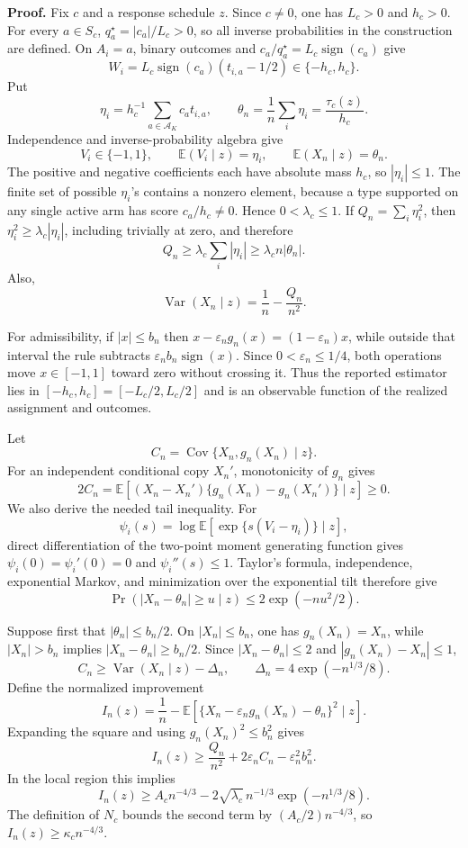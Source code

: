 \textbf{Proof.}
Fix \(c\) and a response schedule \(z\). Since \(c\neq0\), one has \(L_c>0\) and \(h_c>0\). For every \(a\in S_c\), \(q_a^\star=|c_a|/L_c>0\), so all inverse probabilities in the construction are defined. On \(A_i=a\), binary outcomes and \(c_a/q_a^\star=L_c\operatorname{sign}(c_a)\) give
\[
 W_i=L_c\operatorname{sign}(c_a)(t_{i,a}-1/2)\in\{-h_c,h_c\}.
\]
Put
\[
 \eta_i=h_c^{-1}\sum_{a\in\mathcal A_K}c_at_{i,a},
 \qquad
 \theta_n=\frac1n\sum_i\eta_i=\frac{\tau_c(z)}{h_c}.
\]
Independence and inverse-probability algebra give
\[
 V_i\in\{-1,1\},\qquad
 \mathbb E(V_i\mid z)=\eta_i,
 \qquad
 \mathbb E(X_n\mid z)=\theta_n.
\]
The positive and negative coefficients each have absolute mass \(h_c\), so \(|\eta_i|\leq1\). The finite set of possible \(\eta_i\)'s contains a nonzero element, because a type supported on any single active arm has score \(c_a/h_c\neq0\). Hence \(0<\lambda_c\leq1\). If \(Q_n=\sum_i\eta_i^2\), then \(\eta_i^2\geq\lambda_c|\eta_i|\), including trivially at zero, and therefore
\[
 Q_n\geq\lambda_c\sum_i|\eta_i|
 \geq\lambda_c n|\theta_n|.
\]
Also,
\[
 \operatorname{Var}(X_n\mid z)=\frac1n-\frac{Q_n}{n^2}.
\]

For admissibility, if \(|x|\leq b_n\) then \(x-\varepsilon_ng_n(x)=(1-\varepsilon_n)x\), while outside that interval the rule subtracts \(\varepsilon_nb_n\operatorname{sign}(x)\). Since \(0<\varepsilon_n\leq1/4\), both operations move \(x\in[-1,1]\) toward zero without crossing it. Thus the reported estimator lies in \([-h_c,h_c]=[-L_c/2,L_c/2]\) and is an observable function of the realized assignment and outcomes.

Let
\[
 C_n=\operatorname{Cov}\{X_n,g_n(X_n)\mid z\}.
\]
For an independent conditional copy \(X_n'\), monotonicity of \(g_n\) gives
\[
 2C_n=\mathbb E[(X_n-X_n')\{g_n(X_n)-g_n(X_n')\}\mid z]\geq0.
\]
We also derive the needed tail inequality. For
\[
 \psi_i(s)=\log\mathbb E[\exp\{s(V_i-\eta_i)\}\mid z],
\]
direct differentiation of the two-point moment generating function gives \(\psi_i(0)=\psi_i'(0)=0\) and \(\psi_i''(s)\leq1\). Taylor's formula, independence, exponential Markov, and minimization over the exponential tilt therefore give
\[
 \Pr(|X_n-\theta_n|\geq u\mid z)\leq2\exp(-nu^2/2).
\]

Suppose first that \(|\theta_n|\leq b_n/2\). On \(|X_n|\leq b_n\), one has \(g_n(X_n)=X_n\), while \(|X_n|>b_n\) implies \(|X_n-\theta_n|\geq b_n/2\). Since \(|X_n-\theta_n|\leq2\) and \(|g_n(X_n)-X_n|\leq1\),
\[
 C_n\geq\operatorname{Var}(X_n\mid z)-\Delta_n,
 \qquad
 \Delta_n=4\exp(-n^{1/3}/8).
\]
Define the normalized improvement
\[
 I_n(z)=\frac1n-
 \mathbb E[\{X_n-\varepsilon_ng_n(X_n)-\theta_n\}^2\mid z].
\]
Expanding the square and using \(g_n(X_n)^2\leq b_n^2\) gives
\[
 I_n(z)\geq\frac{Q_n}{n^2}+2\varepsilon_nC_n-\varepsilon_n^2b_n^2.
\]
In the local region this implies
\[
 I_n(z)\geq A_cn^{-4/3}
 -2\sqrt{\lambda_c}\,n^{-1/3}\exp(-n^{1/3}/8).
\]
The definition of \(N_c\) bounds the second term by \((A_c/2)n^{-4/3}\), so \(I_n(z)\geq\kappa_cn^{-4/3}\).

